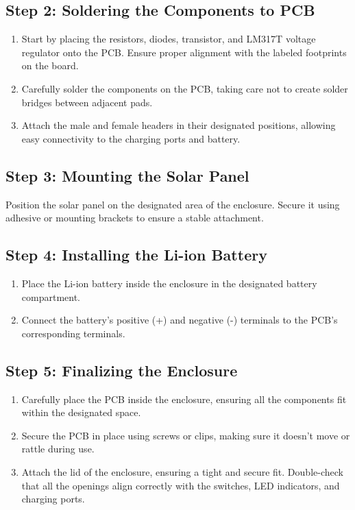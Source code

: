 \documentclass[twocolumn]{article}
\begin{document}
\begin{enumerate}
\subsection*{Step 2: Soldering the Components to PCB}

\begin{enumerate}
    \item Start by placing the resistors, diodes, transistor, and LM317T voltage regulator onto the PCB. Ensure proper alignment with the labeled footprints on the board.
    \item Carefully solder the components on the PCB, taking care not to create solder bridges between adjacent pads.
    \item Attach the male and female headers in their designated positions, allowing easy connectivity to the charging ports and battery.
\end{enumerate}

\subsection*{Step 3: Mounting the Solar Panel}

Position the solar panel on the designated area of the enclosure. Secure it using adhesive or mounting brackets to ensure a stable attachment.


\subsection*{Step 4: Installing the Li-ion Battery}

\begin{enumerate}
    \item Place the Li-ion battery inside the enclosure in the designated battery compartment.
    \item Connect the battery's positive (+) and negative (-) terminals to the PCB's corresponding terminals.
\end{enumerate}

\subsection*{Step 5: Finalizing the Enclosure}

\begin{enumerate}
  \item Carefully place the PCB inside the enclosure, ensuring all the components fit within the designated space.
  \item Secure the PCB in place using screws or clips, making sure it doesn't move or rattle during use.
  \item Attach the lid of the enclosure, ensuring a tight and secure fit. Double-check that all the openings align correctly with the switches, LED indicators, and charging ports.
\end{enumerate}


\end{enumerate}
\end{document}
